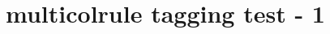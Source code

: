 \documentclass{article}
\title{multicolrule tagging test - 1}
\begin{document}
\begin{multicols}{3}
\kant[1-6]
\end{multicols}
\end{document}
